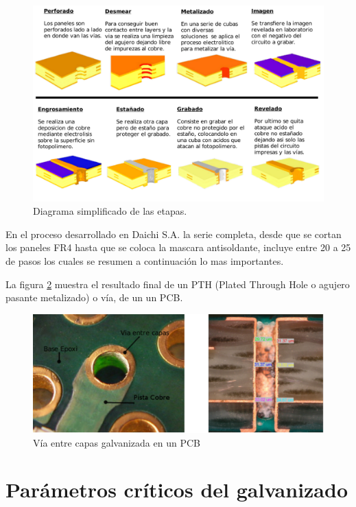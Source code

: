 \begin{figure}[h]
	\centering
	\includegraphics[width=1.0\textwidth]{Figures/Cap_2/diagrama_galvanizado_completo}
	\caption{ Diagrama simplificado de las etapas.}  
	\label{fig:diagrama_proceso}
\end{figure}

En el proceso desarrollado en Daichi S.A. la serie completa, desde que se cortan los paneles FR4 hasta que se coloca la mascara antisoldante, incluye entre 20 a 25 de pasos los cuales se resumen a continuación lo mas importantes.

La figura \ref{fig:galvanizado_pcb} muestra el resultado final de un PTH (Plated Through Hole o agujero pasante metalizado) o  vía, de un un PCB.
\begin{figure}[h]
	\centering
	\includegraphics[width=.8\textwidth]{Figures/Cap_2/galvanizado_pcb_2}
	\caption{Vía entre capas galvanizada en un PCB}
	\label{fig:galvanizado_pcb}
\end{figure}

\section{ Parámetros críticos del galvanizado }

